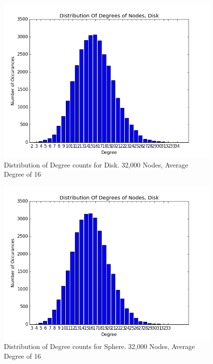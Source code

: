 \documentclass{article}
\begin{document}
\begin{center}
    \begin{figure}
        \includegraphics[scale=0.45]{./graphs/hist_deg_disk.png}
        \caption{Distribution of Degree counts for Disk. 32,000 Nodes, Average Degree of 16}
        \label{diskdeghist}
    \end{figure}
\end{center}

\begin{center}
    \begin{figure}
        \includegraphics[scale=0.45]{./graphs/hist_deg_sphere.png}
        \caption{Distribution of Degree counts for Sphere. 32,000 Nodes, Average Degree of 16}
        \label{spheredeghist}
    \end{figure}
\end{center}
\end{document}
